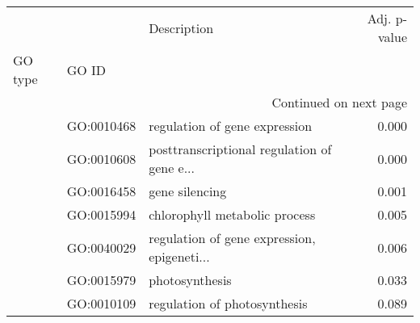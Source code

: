 \begin{longtable}{lllr}
\toprule
   &            &                                  Description &  Adj. p-value \\
GO type & GO ID &                                              &               \\
\midrule
\endhead
\midrule
\multicolumn{4}{r}{{Continued on next page}} \\
\midrule
\endfoot

\bottomrule
\endlastfoot
\multirow{7}{*}{BP} & GO:0010468 &                regulation of gene expression &         0.000 \\
   & GO:0010608 &  posttranscriptional regulation of gene e... &         0.000 \\
   & GO:0016458 &                               gene silencing &         0.001 \\
   & GO:0015994 &                chlorophyll metabolic process &         0.005 \\
   & GO:0040029 &  regulation of gene expression, epigeneti... &         0.006 \\
   & GO:0015979 &                               photosynthesis &         0.033 \\
   & GO:0010109 &                 regulation of photosynthesis &         0.089 \\
\end{longtable}
